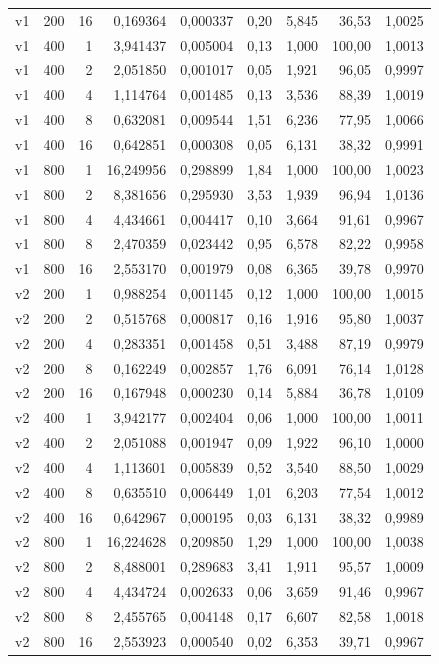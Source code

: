 \begin{longtable}{lrrrrrrrr}
v1 & 200 & 16 & 0,169364 & 0,000337 & 0,20 & 5,845 & 36,53 & 1,0025\\
v1 & 400 & 1 & 3,941437 & 0,005004 & 0,13 & 1,000 & 100,00 & 1,0013\\
v1 & 400 & 2 & 2,051850 & 0,001017 & 0,05 & 1,921 & 96,05 & 0,9997\\
v1 & 400 & 4 & 1,114764 & 0,001485 & 0,13 & 3,536 & 88,39 & 1,0019\\
v1 & 400 & 8 & 0,632081 & 0,009544 & 1,51 & 6,236 & 77,95 & 1,0066\\
v1 & 400 & 16 & 0,642851 & 0,000308 & 0,05 & 6,131 & 38,32 & 0,9991\\
v1 & 800 & 1 & 16,249956 & 0,298899 & 1,84 & 1,000 & 100,00 & 1,0023\\
v1 & 800 & 2 & 8,381656 & 0,295930 & 3,53 & 1,939 & 96,94 & 1,0136\\
v1 & 800 & 4 & 4,434661 & 0,004417 & 0,10 & 3,664 & 91,61 & 0,9967\\
v1 & 800 & 8 & 2,470359 & 0,023442 & 0,95 & 6,578 & 82,22 & 0,9958\\
v1 & 800 & 16 & 2,553170 & 0,001979 & 0,08 & 6,365 & 39,78 & 0,9970\\
v2 & 200 & 1 & 0,988254 & 0,001145 & 0,12 & 1,000 & 100,00 & 1,0015\\
v2 & 200 & 2 & 0,515768 & 0,000817 & 0,16 & 1,916 & 95,80 & 1,0037\\
v2 & 200 & 4 & 0,283351 & 0,001458 & 0,51 & 3,488 & 87,19 & 0,9979\\
v2 & 200 & 8 & 0,162249 & 0,002857 & 1,76 & 6,091 & 76,14 & 1,0128\\
v2 & 200 & 16 & 0,167948 & 0,000230 & 0,14 & 5,884 & 36,78 & 1,0109\\
v2 & 400 & 1 & 3,942177 & 0,002404 & 0,06 & 1,000 & 100,00 & 1,0011\\
v2 & 400 & 2 & 2,051088 & 0,001947 & 0,09 & 1,922 & 96,10 & 1,0000\\
v2 & 400 & 4 & 1,113601 & 0,005839 & 0,52 & 3,540 & 88,50 & 1,0029\\
v2 & 400 & 8 & 0,635510 & 0,006449 & 1,01 & 6,203 & 77,54 & 1,0012\\
v2 & 400 & 16 & 0,642967 & 0,000195 & 0,03 & 6,131 & 38,32 & 0,9989\\
v2 & 800 & 1 & 16,224628 & 0,209850 & 1,29 & 1,000 & 100,00 & 1,0038\\
v2 & 800 & 2 & 8,488001 & 0,289683 & 3,41 & 1,911 & 95,57 & 1,0009\\
v2 & 800 & 4 & 4,434724 & 0,002633 & 0,06 & 3,659 & 91,46 & 0,9967\\
v2 & 800 & 8 & 2,455765 & 0,004148 & 0,17 & 6,607 & 82,58 & 1,0018\\
v2 & 800 & 16 & 2,553923 & 0,000540 & 0,02 & 6,353 & 39,71 & 0,9967\\
\end{longtable}
